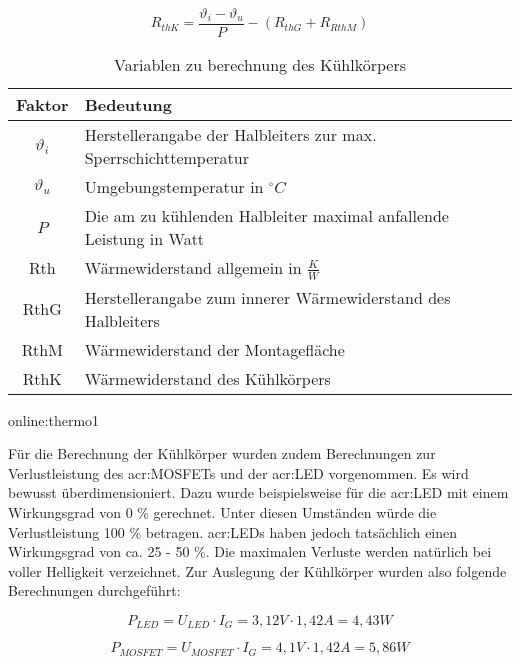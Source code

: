 \begin{equation}
	\label{equ:thermo}
	R_{thK} = \frac{\vartheta_{i}-\vartheta_{u}}{P}-(R_{thG}+R_{RthM})
\end{equation}

\begin{table}[htb]
	\begin{center}
		\begin{tabular}[h]{cl}	
			\toprule
			Faktor & Bedeutung \\
			\midrule
			$\vartheta_{i}$& Herstellerangabe der Halbleiters zur max. Sperrschichttemperatur\\
			$\vartheta_{u}$& Umgebungstemperatur in $^\circ C$ \\
			$P$ &  Die am zu kühlenden Halbleiter maximal anfallende Leistung in Watt\\
			Rth & Wärmewiderstand allgemein in $\frac{K}{W}$ \\
			RthG & Herstellerangabe zum innerer Wärmewiderstand des Halbleiters \\
			RthM & Wärmewiderstand der Montagefläche \\
			RthK &  Wärmewiderstand des Kühlkörpers \\
			\bottomrule
		\end{tabular}
		\caption{Variablen zu berechnung des Kühlkörpers}\gls{online:thermo1}
		\label{tab:thermofaktoren}
	\end{center}
\end{table}

Für die Berechnung der Kühlkörper wurden zudem Berechnungen zur Verlustleistung des
\gls{acr:MOSFET}s und der \gls{acr:LED} vorgenommen. Es wird bewusst überdimensioniert. Dazu wurde beispielsweise für die \gls{acr:LED} mit einem Wirkungsgrad von 0 \% gerechnet. Unter diesen Umständen würde die Verlustleistung 100 \% betragen. \gls{acr:LED}s haben jedoch tatsächlich einen Wirkungsgrad von ca. 25 - 50 \%. Die maximalen Verluste werden natürlich bei voller Helligkeit verzeichnet. Zur Auslegung der Kühlkörper wurden also folgende Berechnungen durchgeführt:

\begin{equation}
	\label{equ:thermoled}
	P_{LED} = U_{LED} \cdot I_{G} = 3,12V \cdot 1,42A= 4,43W
\end{equation}

\begin{equation}
	\label{equ:thermomos}
	P_{MOSFET} = U_{MOSFET} \cdot I_{G} = 4,1V \cdot 1,42A= 5,86W
\end{equation}

